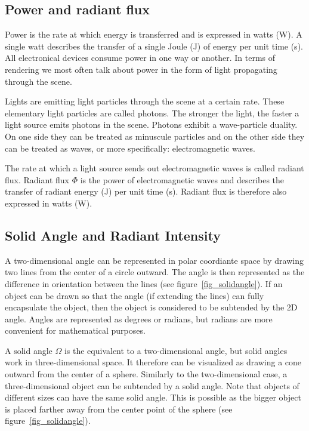 \documentclass[11pt,a4paper]{report}
\begin{document}
\subsection{Power and radiant flux}

Power is the rate at which energy is transferred and is expressed in watts (W). A single watt describes the transfer of a single Joule (J) of energy per unit time (s). All electronical devices consume power in one way or another. In terms of rendering we most often talk about power in the form of light propagating through the scene. 

Lights are emitting light particles through the scene at a certain rate. These elementary light particles are called photons. The stronger the light, the faster a light source emits photons in the scene. Photons exhibit a wave-particle duality. On one side they can be treated as minuscule particles and on the other side they can be treated as waves, or more specifically: electromagnetic waves.

The rate at which a light source sends out electromagnetic waves is called radiant flux. Radiant flux $\Phi$ is the power of electromagnetic waves and describes the transfer of radiant energy (J) per unit time (s). Radiant flux is therefore also expressed in watts (W).

\subsection{Solid Angle and Radiant Intensity}

A two-dimensional angle can be represented in polar coordiante space by drawing two lines from the center of a circle outward. The angle is then represented as the difference in orientation between the lines (see figure~\ref{fig_solidangle}). If an object can be drawn so that the angle (if extending the lines) can fully encapsulate the object, then the object is considered to be subtended by the 2D angle. Angles are represented as degrees or radians, but radians are more convenient for mathematical purposes. 

A solid angle $\Omega$ is the equivalent to a two-dimensional angle, but solid angles work in three-dimensional space. It therefore can be visualized as drawing a cone outward from the center of a sphere. Similarly to the two-dimensional case, a three-dimensional object can be subtended by a solid angle. Note that objects of different sizes can have the same solid angle. This is possible as the bigger object is placed farther away from the center point of the sphere (see figure~\ref{fig_solidangle}).
\end{document}
